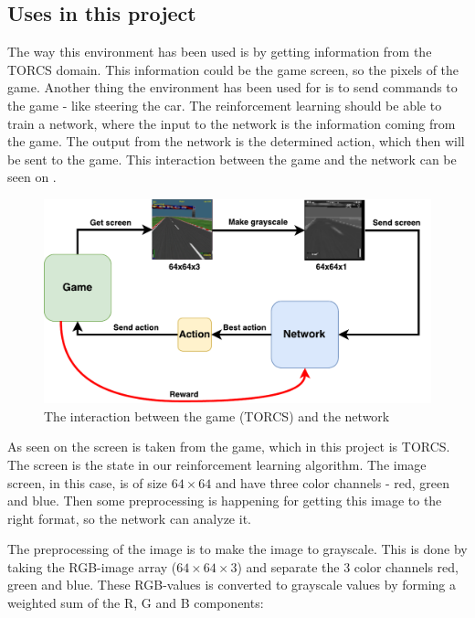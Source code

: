 \subsection{Uses in this project}      
The way this environment has been used is by getting information from the TORCS domain. This information could be the game screen, so the pixels of the game. Another thing the environment has been used for is to send commands to the game - like steering the car. 
The reinforcement learning should be able to train a network, where the input to the network is the information coming from the game. The output from the network is the determined action, which then will be sent to the game. This interaction between the game and the network can be seen on .   
 
\begin{figure}[H]
	\centering
	\includegraphics[width=1\textwidth]{Figures/Architecture/TORCS_interaction.pdf}
	\caption{The interaction between the game (TORCS) and the network }
	\label{fig:TORCS_interaction}
\end{figure}

 
As seen on  the screen is taken from the game, which in this project is TORCS. The screen is the state in our reinforcement learning algorithm. The image screen, in this case, is of size $64 \times 64$ and have three color channels - red, green and blue. Then some preprocessing is happening for getting this image to the right format, so the network can analyze it. 

The preprocessing of the image is to make the image to grayscale. This is done by taking the RGB-image array ($64 \times 64 \times 3$) and separate the 3 color channels red, green and blue. These RGB-values is converted to grayscale values by forming a weighted sum of the R, G and B components:

